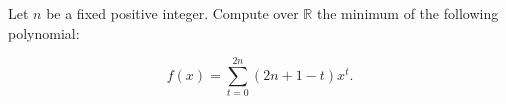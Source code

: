 Let $n$ be a fixed positive integer. Compute over $\mathbb{R}$ the minimum of the following polynomial:

\[f(x)=\sum_{t=0}^{2n}(2n+1-t)x^t.\]